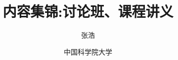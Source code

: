 
\usepackage{calrsfs} %
\usepackage{stmaryrd}%

\title{内容集锦:讨论班、课程讲义}
\author{张浩}
\date{中国科学院大学}
\maketitle
\tableofcontents




% 
% 
% 
% 
% 
% 
% 
% 
% 
% 

\printindex




